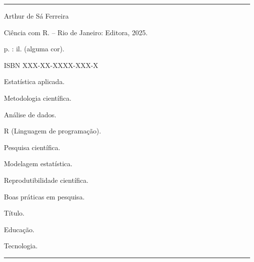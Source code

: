 \newcommand{\autorLivro}{Arthur de Sá Ferreira}
\newcommand{\tituloLivro}{Ciência com R}
\newcommand{\localPublicacao}{Rio de Janeiro}
\newcommand{\editora}{Editora}
\newcommand{\anoPublicacao}{2025}
\newcommand{\isbn}{XXX-XX-XXXX-XXX-X}

\newcommand{\palavraschavea}{Estatística aplicada}
\newcommand{\palavraschaveb}{Metodologia científica}
\newcommand{\palavraschavec}{Análise de dados}
\newcommand{\palavraschaved}{R (Linguagem de programação)}
\newcommand{\palavraschavee}{Pesquisa científica}
\newcommand{\palavraschavef}{Modelagem estatística}
\newcommand{\palavraschaveg}{Reprodutibilidade científica}
\newcommand{\palavraschaveh}{Boas práticas em pesquisa}


\hrule
\begin{center}
\begin{minipage}[c]{12.5cm}

\autorLivro

\hspace{0.5cm} \tituloLivro. -- \localPublicacao: \editora, \anoPublicacao.

\hspace{0.5cm} \pageref{LastPage} p. : il. (alguma cor).

\hspace{0.5cm} ISBN \isbn

\hspace{0.5cm}
\begin{inparaenum}[1.]
  \item \palavraschavea.
  \item \palavraschaveb.
  \item \palavraschavec.
  \item \palavraschaved.
  \item \palavraschavee.
  \item \palavraschavef.
  \item \palavraschaveg.
  \item \palavraschaveh.
\end{inparaenum}

\begin{inparaenum}[I.]
  \item Título.
  \item Educação.
  \item Tecnologia.
\end{inparaenum}

\end{minipage}
\end{center}
\hrule

